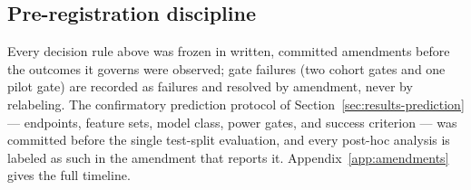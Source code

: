 \subsection{Pre-registration discipline}

Every decision rule above was frozen in written, committed amendments
before the outcomes it governs were observed; gate failures (two cohort
gates and one pilot gate) are recorded as failures and resolved by
amendment, never by relabeling. The confirmatory prediction protocol of
Section~\ref{sec:results-prediction} --- endpoints, feature sets, model
class, power gates, and success criterion --- was committed before the
single test-split evaluation, and every post-hoc analysis is labeled as
such in the amendment that reports it. Appendix~\ref{app:amendments} gives
the full timeline.
